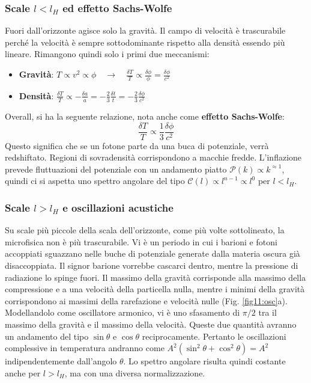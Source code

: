 \subsubsection{Scale $l<l_H$ ed effetto Sachs-Wolfe}
Fuori dall'orizzonte agisce solo la gravità. Il campo di velocità è trascurabile perché la velocità è sempre sottodominante rispetto alla densità essendo più lineare. Rimangono quindi solo i primi due meccanismi:
\begin{itemize}
    \item \textbf{Gravità}: $T\propto v^2 \propto \phi \quad\rightarrow\quad \frac{\delta T }{T}\propto \frac{\delta \phi }{\phi} =\frac{\delta \phi }{c^2}$
    \item \textbf{Densità}: $\frac{\delta T }{T} \propto - \frac{\delta a}{a} = -\frac{2}{3}\frac{\delta t }{t} = -\frac{2}{3}\frac{\delta \phi }{c^2}$
\end{itemize} 
Overall, si ha la seguente relazione, nota anche come \textbf{effetto Sachs-Wolfe}:
\begin{equation}
    \frac{\delta T}{T}\propto \frac{1}{3}\frac{\delta\phi}{c^2}
\end{equation}
Questo significa che se un fotone parte da una buca di potenziale, verrà redshiftato. Regioni di sovradensità corrispondono a macchie fredde. L'inflazione prevede fluttuazioni del potenziale con un andamento piatto $\mathcal{P}(k)\propto k^{\approx 1}$, quindi ci si aspetta uno spettro angolare del tipo $\mathcal{C}(l)\propto l^{n-1}\propto l^0$ per $l<l_H$.

\subsubsection{Scale $l>l_H$ e oscillazioni acustiche}
Su scale più piccole della scala dell'orizzonte, come più volte sottolineato, la microfisica non è più trascurabile. Vi è un periodo in cui i barioni e fotoni accoppiati sguazzano nelle buche di potenziale generate dalla materia oscura già disaccoppiata. Il signor barione vorrebbe cascarci dentro, mentre la pressione di radiazione lo spinge fuori. Il massimo della gravità corrisponde alla massimo della compressione e a una velocità della particella nulla, mentre i minimi della gravità corrispondono ai massimi della rarefazione e velocità nulle (Fig. \ref{fig11:osc}a). Modellandolo come oscillatore armonico, vi è uno sfasamento di $\pi/2$ tra il massimo della gravità e il massimo della velocità. Queste due quantità avranno un andamento del tipo $\sin\theta$ e $\cos\theta$ reciprocamente. Pertanto le oscillazioni complessive in temperatura andranno come $A^2(\sin^2\theta+\cos^2\theta)=A^2$ indipendentemente dall'angolo $\theta$. Lo spettro angolare risulta quindi costante anche per $l>l_H$, ma con una diversa normalizzazione.

